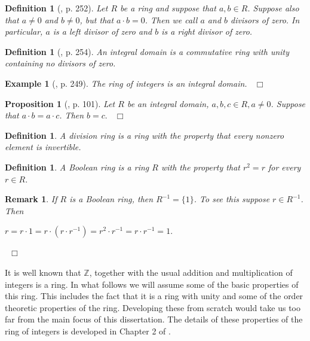 \documentclass[12pt, oneside]{book}
\newtheorem{proposition}[theorem]{Proposition}
\newtheorem{example}[theorem]{Example}
\newtheorem{definition}[theorem]{Definition}
\newtheorem{remark}[theorem]{Remark}
\newcommand{\qed}{\hfill ~$\Box$\\}
\begin{document}
\begin{definition}[\cite{F}, p. 252]
\normalfont
Let $R$ be a ring and suppose that $a, b \in R$. Suppose also that $a \neq 0$ and $b \neq 0$, but that 
$a \cdot b = 0$. Then we call $a$ and $b$ {\sl divisors of zero}. In particular, $a$ is a {\sl left} divisor of zero and $b$ is a {\sl right} divisor of zero.

\end{definition}

\begin{definition}[\cite{F}, p. 254]
\normalfont
\noindent An {\sl integral domain} is a commutative ring with unity containing no divisors 
of zero.
\end{definition}

\begin{example}[\cite{G}, p. 249] \label{ZIsAnIntegralDom}
\normalfont
\noindent The ring of integers is an integral domain. \qed
\end{example}

\begin{proposition} [\cite{G1}, p. 101]
\normalfont
\noindent Let $R$ be an integral domain, $a, b, c \in R, a\neq 0$. Suppose that $a\cdot b = a\cdot c$. Then $b = c.$ \qed
\end{proposition}

\begin{definition} \label{dfnDivisionRing}
\normalfont
A {\sl division ring} is a ring with the property that every nonzero element is invertible.

\end{definition}


\begin{definition}
\textup{A {\sl Boolean ring} is a ring $R$ with the property that $r^2=r$ for every $r \in R$.} 
\end{definition}
\begin{remark} \label{BooleanInvertibles}
\normalfont
If $R$ is a Boolean ring, then $R^{-1}=\{1\}$. To see this suppose $r \in R^{-1}$. Then 
\begin{center}
$r=r \cdot 1=r \cdot (r \cdot r^{-1})=r^2 \cdot r^{-1}=r \cdot r^{-1}=1.$
\end{center}
\qed
\end{remark}

\noindent It is well known that $\mathbb{Z}$, together with the usual addition and multiplication of integers is a ring. In what follows we will assume some of the basic properties of this ring. 
This includes the fact that it is a ring with unity and some of the order theoretic properties of the ring. Developing these from scratch would take us too far from the main focus of this dissertation. The details of these properties of the ring of integers is developed in Chapter 2 of \cite{G1}.
\end{document}
